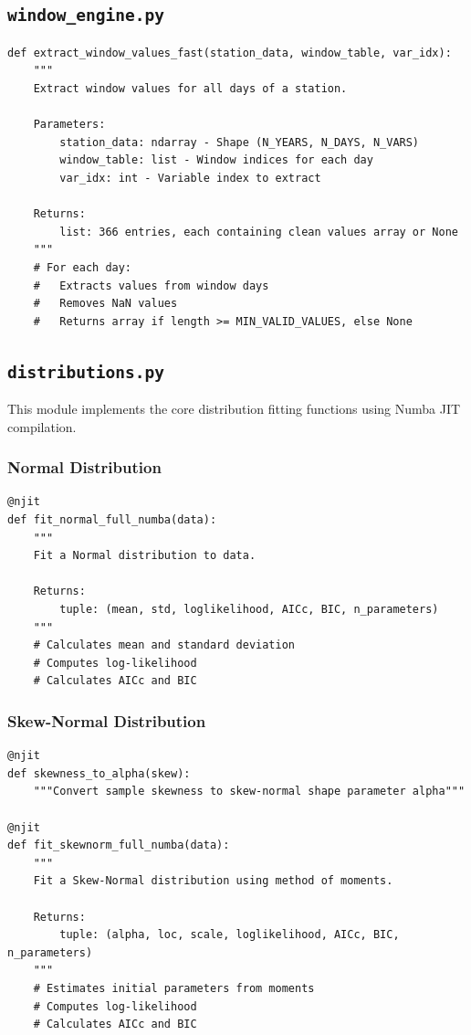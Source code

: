 ﻿\documentclass[12pt,a4paper]{report}
\begin{document}
\subsection{\texttt{window\_engine.py}}
\begin{lstlisting}[caption=window\_engine.py]
def extract_window_values_fast(station_data, window_table, var_idx):
    """
    Extract window values for all days of a station.
    
    Parameters:
        station_data: ndarray - Shape (N_YEARS, N_DAYS, N_VARS)
        window_table: list - Window indices for each day
        var_idx: int - Variable index to extract
    
    Returns:
        list: 366 entries, each containing clean values array or None
    """
    # For each day:
    #   Extracts values from window days
    #   Removes NaN values
    #   Returns array if length >= MIN_VALID_VALUES, else None
\end{lstlisting}

\subsection{\texttt{distributions.py}}
This module implements the core distribution fitting functions using Numba JIT compilation.

\subsubsection{Normal Distribution}
\begin{lstlisting}[caption=Normal Distribution Fitting]
@njit
def fit_normal_full_numba(data):
    """
    Fit a Normal distribution to data.
    
    Returns:
        tuple: (mean, std, loglikelihood, AICc, BIC, n_parameters)
    """
    # Calculates mean and standard deviation
    # Computes log-likelihood
    # Calculates AICc and BIC
\end{lstlisting}

\subsubsection{Skew-Normal Distribution}
\begin{lstlisting}[caption=Skew-Normal Fitting]
@njit
def skewness_to_alpha(skew):
    """Convert sample skewness to skew-normal shape parameter alpha"""

@njit
def fit_skewnorm_full_numba(data):
    """
    Fit a Skew-Normal distribution using method of moments.
    
    Returns:
        tuple: (alpha, loc, scale, loglikelihood, AICc, BIC, n_parameters)
    """
    # Estimates initial parameters from moments
    # Computes log-likelihood
    # Calculates AICc and BIC
\end{lstlisting}
\end{document}
